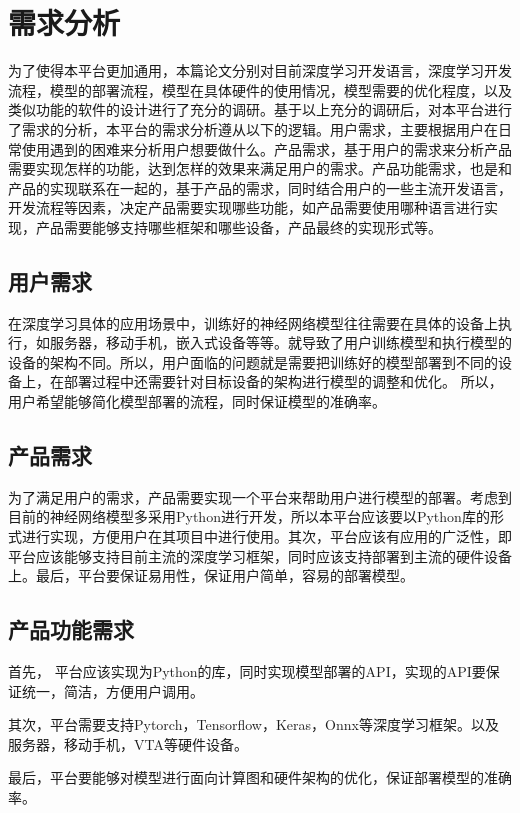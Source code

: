 \chapter{需求分析}

为了使得本平台更加通用，本篇论文分别对目前深度学习开发语言，深度学习开发流程，模型的部署流程，模型在具体硬件的使用情况，模型需要的优化程度，以及类似功能的软件的设计进行了充分的调研。基于以上充分的调研后，对本平台进行了需求的分析，本平台的需求分析遵从以下的逻辑。用户需求，主要根据用户在日常使用遇到的困难来分析用户想要做什么。产品需求，基于用户的需求来分析产品需要实现怎样的功能，达到怎样的效果来满足用户的需求。产品功能需求，也是和产品的实现联系在一起的，基于产品的需求，同时结合用户的一些主流开发语言，开发流程等因素，决定产品需要实现哪些功能，如产品需要使用哪种语言进行实现，产品需要能够支持哪些框架和哪些设备，产品最终的实现形式等。


\section{用户需求}

在深度学习具体的应用场景中，训练好的神经网络模型往往需要在具体的设备上执行，如服务器，移动手机，嵌入式设备等等。就导致了用户训练模型和执行模型的设备的架构不同。所以，用户面临的问题就是需要把训练好的模型部署到不同的设备上，在部署过程中还需要针对目标设备的架构进行模型的调整和优化。 所以，用户希望能够简化模型部署的流程，同时保证模型的准确率。


\section{产品需求}

为了满足用户的需求，产品需要实现一个平台来帮助用户进行模型的部署。考虑到目前的神经网络模型多采用Python进行开发，所以本平台应该要以Python库的形式进行实现，方便用户在其项目中进行使用。其次，平台应该有应用的广泛性，即平台应该能够支持目前主流的深度学习框架，同时应该支持部署到主流的硬件设备上。最后，平台要保证易用性，保证用户简单，容易的部署模型。


\section{产品功能需求}

首先， 平台应该实现为Python的库，同时实现模型部署的API，实现的API要保证统一，简洁，方便用户调用。

其次，平台需要支持Pytorch，Tensorflow，Keras，Onnx等深度学习框架。以及服务器，移动手机，VTA等硬件设备。

最后，平台要能够对模型进行面向计算图和硬件架构的优化，保证部署模型的准确率。